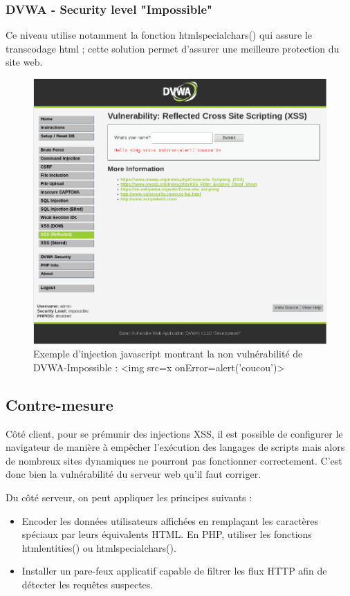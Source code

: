 \subsubsection{DVWA - Security level "Impossible"}

Ce niveau utilise notamment la fonction htmlspecialchars() qui assure le transcodage html ; cette solution permet d'assurer une meilleure protection du site web.
\begin{figure}[H]
	\begin{center}
		\includegraphics[scale=\scaledvwa]{images/xss/hack3.png}
		\caption{Exemple d'injection javascript montrant la non vulnérabilité de DVWA-Impossible : <img src=x onError=alert('coucou')>} 
		\label{hack3}
	\end{center}
\end{figure}

\subsection{Contre-mesure}

Côté client, pour se prémunir des injections XSS, il est possible de configurer le navigateur de manière à empêcher l'exécution des langages de scripts mais alors de nombreux sites dynamiques ne pourront pas fonctionner correctement. C'est donc bien la vulnérabilité du serveur web qu'il faut corriger.


Du côté serveur, on peut appliquer les principes suivants :
\begin{itemize}[font=\color{magenta} \Large, label=]
	\item Encoder les données utilisateurs affichées en remplaçant les caractères spéciaux par leurs équivalents HTML. En PHP, utiliser les fonctions htmlentities() ou htmlspecialchars().​ 
	\item Installer un pare-feux applicatif capable de filtrer les flux HTTP afin de détecter les requêtes suspectes.

\end{itemize}



